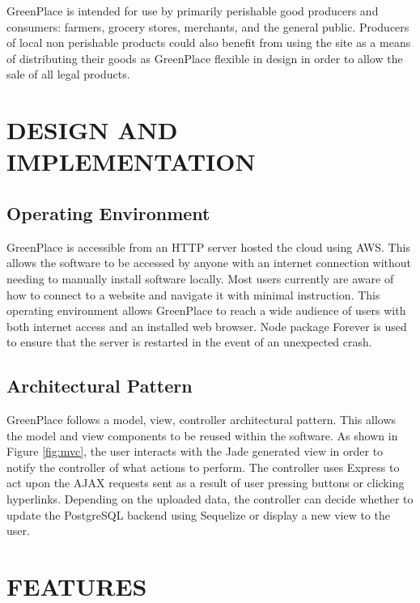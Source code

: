\documentclass[letterpaper, 10 pt, conference]{ieeeconf}  %
\begin{document}
GreenPlace is intended for use by primarily perishable good producers and consumers: farmers, grocery stores, merchants, and the general public. Producers of local non perishable products could also benefit from using the site as a means of distributing their goods as GreenPlace flexible in design in order to allow the sale of all legal products.

\section{DESIGN AND IMPLEMENTATION}

\subsection{Operating Environment}

GreenPlace is accessible from an HTTP server hosted the cloud using AWS. This allows the software to be accessed by anyone with an internet connection without needing to manually install software locally. Most users currently are aware of how to connect to a website and navigate it with minimal instruction. This operating environment allows GreenPlace to reach a wide audience of users with both internet access and an installed web browser. Node package Forever is used to ensure that the server is restarted in the event of an unexpected crash.

\subsection{Architectural Pattern}

GreenPlace follows a model, view, controller architectural pattern. This allows the model and view components to be reused within the software. As shown in Figure \ref{fig:mvc}, the user interacts with the Jade generated view in order to notify the controller of what actions to perform. The controller uses Express to act upon the AJAX requests sent as a result of user pressing buttons or clicking hyperlinks. Depending on the uploaded data, the controller can decide whether to update the PostgreSQL backend using Sequelize or display a new view to the user.

\section{FEATURES}
\end{document}
